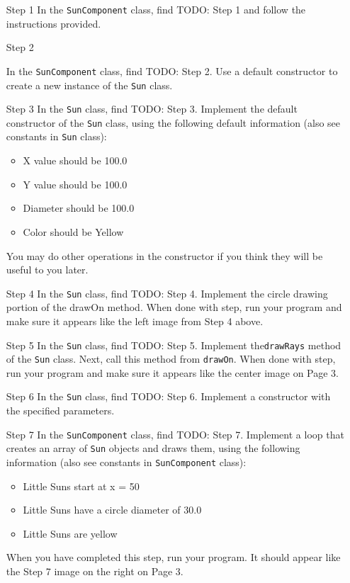 \documentclass[12pt,twoside]{article}
\newcommand{\code}[1]{\texttt{#1}}
\begin{document}
\begin{itemize}
\item[Step 1] 
In the \code{SunComponent} class, find TODO: Step 1 and follow the instructions provided.


\item[Step 2] 

In the \code{SunComponent} class, find TODO: Step 2. Use a default constructor to create a new instance of the \code{Sun} class.

\item[Step 3] 
In the \code{Sun} class, find TODO: Step 3. Implement the default constructor of the \code{Sun} class, using the following default information (also see constants in \code{Sun} class):
\begin{itemize}
\item X value should be 100.0
\item Y value should be 100.0
\item Diameter should be 100.0
\item Color should be Yellow
\end{itemize}

You may do other operations in the constructor if you think they will be useful to you later.

\newpage
\item[Step 4] 
In the \code{Sun} class, find TODO: Step 4. Implement the circle drawing portion of the drawOn method. When done with step, run your program and make sure it appears like the left image from  Step 4 above.


\item[Step 5] 
In the \code{Sun} class, find TODO: Step 5. Implement the\code{drawRays} method of the \code{Sun} class. Next, call this method from \code{drawOn}. When done with step, run your program and make sure it appears like the center image on Page 3.

\item[Step 6] 
In the \code{Sun} class, find TODO: Step 6. Implement a constructor with the specified parameters.

\item[Step 7] 
In the \code{SunComponent} class, find TODO: Step 7. Implement a loop that creates an array of \code{Sun} objects and draws them, using the following information (also see constants in \code{SunComponent} class):

\begin{itemize}
\item Little Suns start at x = 50 
\item Little Suns have a circle diameter of 30.0 
\item Little Suns are yellow
\end{itemize}

When you have completed this step, run your program. It should appear like the Step 7 image on the right on Page 3.

\end{itemize}
\end{document}
